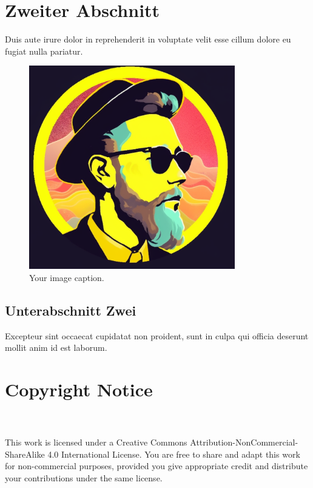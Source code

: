 \documentclass[a4paper]{article}
\begin{document}
	\section{Zweiter Abschnitt}
	Duis aute irure dolor in reprehenderit in voluptate velit esse cillum dolore eu fugiat nulla pariatur.
	\begin{figure}[htbp]
		\centering
		\includegraphics[width=0.8\textwidth]{figures/logo}
		\caption{Your image caption.}
		\label{fig:your_image}
	\end{figure}
	
	\subsection{Unterabschnitt Zwei}
	Excepteur sint occaecat cupidatat non proident, sunt in culpa qui officia deserunt mollit anim id est laborum.
	\newpage
	\section*{Copyright Notice}
	\fbox{\Huge \ccbyncsa{}}\\\\
	This work is licensed under a Creative Commons Attribution-NonCommercial-ShareAlike 4.0 International License. You are free to share and adapt this work for non-commercial purposes, provided you give appropriate credit and distribute your contributions under the same license.\\\\
	
	\newpage
	
	
	\newpage
	\lstlistoflistings
	\newpage
	\listoffigures
	
\end{document}
